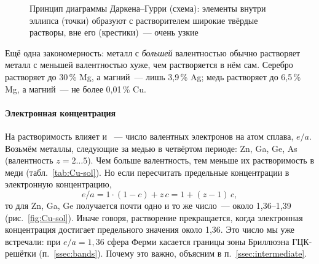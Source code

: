 \begin{figure}[ht]
\centering
{}
\caption{Принцип диаграммы Даркена--Гурри (схема): элементы внутри эллипса
(точки) образуют с растворителем широкие твёрдые растворы, вне его
(крестики)~— очень узкие}
\label{fig:darken}
\end{figure}

Ещё одна закономерность: металл с \emph{большей} валентностью обычно
растворяет металл с меньшей валентностью хуже, чем растворяется в нём
сам. Серебро растворяет до 30\,\% Mg, а магний~— лишь 3,9\,\% Ag; медь
растворяет до 6,5\,\% Mg, а магний~— не более 0,01\,\% Cu.

\paragraph{Электронная концентрация}
На растворимость влияет и ~— число
валентных электронов на атом сплава, $e/a$. Возьмём металлы, следующие
за медью в четвёртом периоде: Zn, Ga, Ge, As (валентность $z=2\ldots5$).
Чем больше валентность, тем меньше их растворимость в меди
(табл.~\ref{tab:Cu-sol}). Но если пересчитать предельные концентрации в
электронную концентрацию,
\[
e/a=1\cdot(1-c)+z\,c=1+(z-1)\,c ,
\]
то для Zn, Ga, Ge получается почти одно и то же число~— около 1,36--1,39
(рис.~\ref{fig:Cu-sol}). Иначе говоря, растворение прекращается, когда
электронная концентрация достигает предельного значения около 1,36.
Это число мы уже встречали: при $e/a=1{,}36$ сфера Ферми касается
границы зоны Бриллюэна ГЦК-решётки (п.~\ref{ssec:bands}). Почему это
важно, объясним в п.~\ref{ssec:intermediate}.

